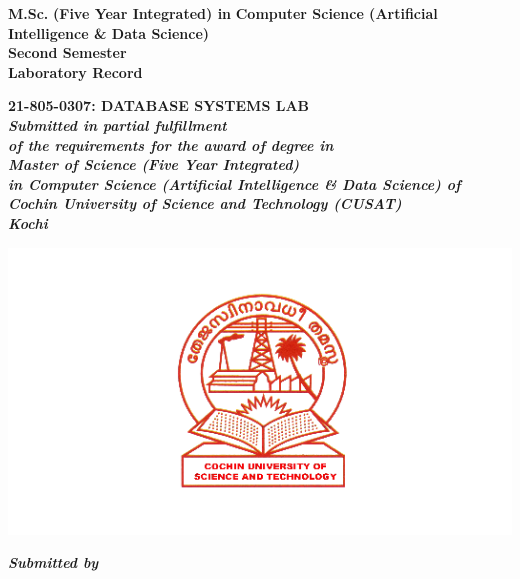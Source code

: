 \documentclass[a4paper,12pt]{report}
\begin{document}
	\begin{center}
		\vspace{12pt}
		\Large\textbf{M.Sc.}
		\Large\textbf{(Five Year Integrated) in}
		\Large\textbf{Computer Science  (Artificial Intelligence \& Data Science)\\}
		\vspace{30pt}
		\Large\textbf{Second Semester}
		\vspace*{50pt}
		\textbf{\\ Laboratory Record}
		\vspace{5pt}
		
		\Large\textbf{21-805-0307: DATABASE SYSTEMS LAB\\ }
		\vspace*{40pt}
		\small\textit{\textbf{Submitted in partial fulfillment\\ of the requirements for the award of degree in \\ Master of Science (Five Year Integrated)\\in Computer Science (Artificial Intelligence \& Data Science) of \\ Cochin University of Science and Technology (CUSAT) \\ Kochi\\ }}
		\vspace*{10pt}
		\begin{center}
		\includegraphics[scale=0.5]{cusat.png}	
		\end{center}
		
		\vspace*{0pt}
		\begin{center}
		\textbf{\textit{Submitted by\hspace{350pt}}}
		\end{center}



\end{center}
\end{document}
